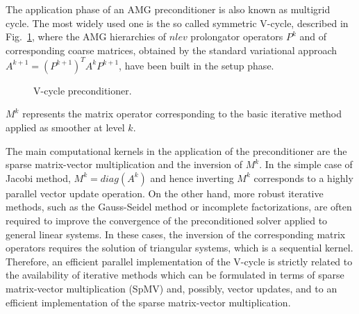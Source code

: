 The application phase of an AMG preconditioner is also known as
multigrid cycle. The most widely used one is the so called symmetric
V-cycle, described in Fig.~\ref{Vcycle}, where the AMG hierarchies of
$nlev$ prolongator operators $P^k$ and of corresponding coarse
matrices, obtained by the standard variational approach
$A^{k+1}=(P^{k+1})^TA^kP^{k+1}$, have been built in the setup phase.
%
\begin{figure}[t]
\begin{center}
\caption{V-cycle preconditioner.\label{Vcycle}}
\end{center}
\end{figure}
%
$M^k$ represents the matrix
operator corresponding to the basic iterative method applied as smoother
at level $k$. 

The main computational kernels in the application of the preconditioner
are the sparse matrix-vector multiplication and the inversion of  $M^k$.
In the simple case of Jacobi method, $M^k=diag(A^k)$ and hence
inverting $M^k$ corresponds to a highly parallel vector
update operation. On the other hand, more robust iterative methods,
such as the Gauss-Seidel method or incomplete factorizations, are
often required to improve the convergence of the preconditioned solver
applied to general linear systems. In these cases, the inversion of
the corresponding matrix operators requires the solution of triangular
systems, which is a sequential kernel. Therefore, an
efficient parallel implementation of the V-cycle is
strictly related to the availability of iterative
methods which can be formulated in terms of sparse matrix-vector multiplication (SpMV)
and, possibly, vector updates, and to an efficient implementation of the sparse
matrix-vector multiplication.
